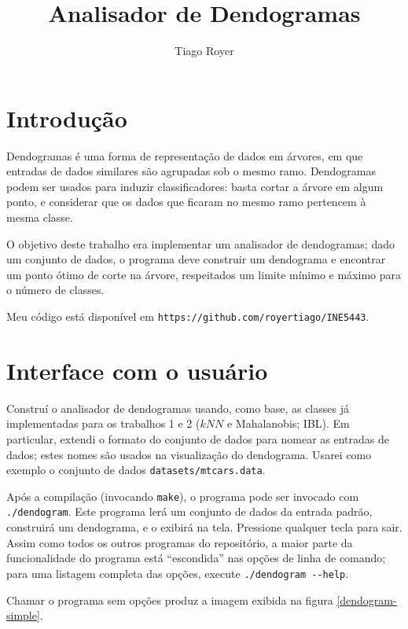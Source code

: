 \documentclass{article}
\author{Tiago Royer}
\title{Analisador de Dendogramas}
\begin{document}
\maketitle

\section{Introdução}

Dendogramas é uma forma de representação de dados em árvores,
em que entradas de dados similares são agrupadas sob o mesmo ramo.
Dendogramas podem ser usados para induzir classificadores:
basta cortar a árvore em algum ponto,
e considerar que os dados que ficaram no mesmo ramo pertencem à mesma classe.

O objetivo deste trabalho era implementar um analisador de dendogramas;
dado um conjunto de dados,
o programa deve construir um dendograma
e encontrar um ponto ótimo de corte na árvore,
respeitados um limite mínimo e máximo para o número de classes.

Meu código está disponível em \verb"https://github.com/royertiago/INE5443".

\section{Interface com o usuário}

Construí o analisador de dendogramas usando, como base,
as classes já implementadas para os trabalhos 1 e 2
($k\mathit{NN}$ e Mahalanobis; IBL).
Em particular, extendi o formato do conjunto de dados
para nomear as entradas de dados;
estes nomes são usados na visualização do dendograma.
Usarei como exemplo o conjunto de dados \verb"datasets/mtcars.data".

Após a compilação (invocando \verb"make"),
o programa pode ser invocado com \verb"./dendogram".
Este programa lerá um conjunto de dados da entrada padrão,
construirá um dendograma,
e o exibirá na tela.
Pressione qualquer tecla para sair.
Assim como todos os outros programas do repositório,
a maior parte da funcionalidade do programa está ``escondida'' 
nas opções de linha de comando;
para uma listagem completa das opções,
execute \verb"./dendogram --help".

Chamar o programa sem opções produz a imagem exibida na figura \ref{dendogram-simple}.
\end{document}
